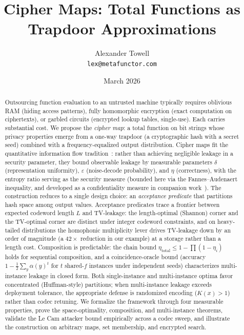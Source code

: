 \documentclass[11pt]{article}
\title{Cipher Maps: Total Functions as Trapdoor Approximations}
\author{Alexander Towell\\\texttt{lex@metafunctor.com}}
\date{March 2026}
\theoremstyle{definition}
\theoremstyle{plain}
\theoremstyle{remark}
\begin{document}
\maketitle

\begin{abstract}
Outsourcing function evaluation to an untrusted machine typically
requires oblivious RAM (hiding access patterns), fully homomorphic
encryption (exact computation on ciphertexts), or garbled circuits
(encrypted lookup tables, single-use).  Each carries substantial cost.
We propose the \emph{cipher map}: a total function on bit strings whose
privacy properties emerge from a one-way trapdoor (a cryptographic
hash with a secret seed) combined with a frequency-equalized output
distribution.  Cipher maps fit the quantitative information flow
tradition~\cite{smith2009foundations,alvim2012measuring}: rather than
achieving negligible leakage in a security parameter, they bound
observable leakage by measurable parameters $\delta$ (representation
uniformity), $\varepsilon$ (noise-decode probability), and $\eta$
(correctness), with the entropy ratio serving as the security measure
(bounded here via the Fannes--Audenaert inequality, and developed as a
confidentiality measure in companion work~\cite{towell2026maxconf}).  The
construction reduces to a single design choice: an \emph{acceptance
predicate} that partitions hash space among output values.  Acceptance
predicates trace a frontier between expected codeword length $L$ and
TV-leakage: the length-optimal (Shannon) corner and the TV-optimal
corner are distinct under integer codeword constraints, and on
heavy-tailed distributions the homophonic multiplicity lever drives
TV-leakage down by an order of magnitude (a $42\times$ reduction in our
example) at a storage rather than a length cost.  Composition is
predictable: the chain bound
$\eta_{\mathrm{total}} \leq 1 - \prod(1 - \eta_i)$ holds for sequential
composition, and a coincidence-oracle bound (accuracy $1 - \tfrac{1}{2}
\sum_y \alpha(y)^t$ for $t$ shared-$f$ instances under independent
seeds) characterizes multi-instance leakage in closed form.  Both
single-instance and multi-instance optima favor concentrated
(Huffman-style) partitions; when multi-instance leakage exceeds
deployment tolerance, the appropriate defense is randomized encoding
($K(x) > 1$) rather than codec retuning.  We formalize the
framework through four measurable properties, prove the
space-optimality, composition, and multi-instance theorems, validate
the Le Cam attacker bound empirically across a codec sweep, and
illustrate the construction on arbitrary maps, set membership, and
encrypted search.
\end{abstract}
\end{document}
